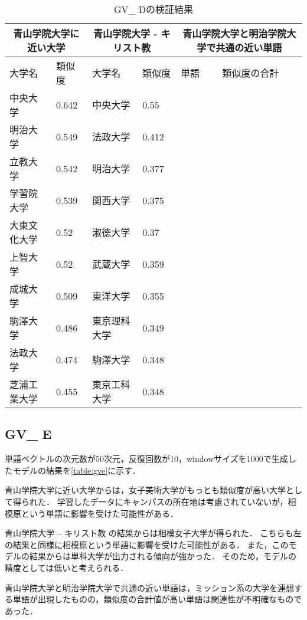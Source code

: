 \begin{table}[H]
\caption{GV\_ Dの検証結果}
\centering
\footnotesize
\begin{tabular}{ll|ll|ll}
\hline
\multicolumn{2}{c}{青山学院大学に近い大学} & \multicolumn{2}{c}{青山学院大学 - キリスト教} & \multicolumn{2}{c}{青山学院大学と明治学院大学で共通の近い単語}
\\ \hline
大学名 & 類似度 & 大学名 & 類似度 & 単語 & 類似度の合計
\\ \hline \hline
中央大学 & 0.642 & 中央大学 & 0.55 & & \\
明治大学 & 0.549 & 法政大学 & 0.412 & & \\
立教大学 & 0.542 & 明治大学 & 0.377 & & \\
学習院大学 & 0.539 & 関西大学 & 0.375 & & \\
大東文化大学 & 0.52 & 淑徳大学 & 0.37 & & \\
上智大学 & 0.52 & 武蔵大学 & 0.359 & & \\
成城大学 & 0.509 & 東洋大学 & 0.355 & & \\
駒澤大学 & 0.486 & 東京理科大学 & 0.349 & & \\
法政大学 & 0.474 & 駒澤大学 & 0.348 & & \\
芝浦工業大学 & 0.455 & 東京工科大学 & 0.348 & & \\ \hline
\end{tabular}
\label{table:gvd}
\end{table}

\subsection{GV\_ E}
単語ベクトルの次元数が50次元，反復回数が10，windowサイズを1000で生成したモデルの結果を\ref{table:gve}に示す．

青山学院大学に近い大学からは，女子美術大学がもっとも類似度が高い大学として得られた．
学習したデータにキャンパスの所在地は考慮されていないが，相模原という単語に影響を受けた可能性がある．

$ 青山学院大学 - キリスト教 $ の結果からは相模女子大学が得られた．
こちらも左の結果と同様に相模原という単語に影響を受けた可能性がある．
また，このモデルの結果からは単科大学が出力される傾向が強かった．
そのため，モデルの精度としては低いと考えられる．

青山学院大学と明治学院大学で共通の近い単語は，ミッション系の大学を連想する単語が出現したものの，類似度の合計値が高い単語は関連性が不明確なものであった．

